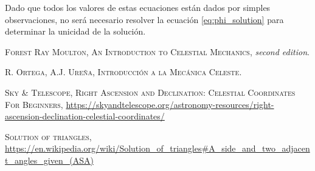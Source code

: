 \documentclass[11pt]{article}
\begin{document}
Dado que todos los valores de estas ecuaciones están dados por simples observaciones, no será necesario resolver la ecuación \eqref{eq:phi_solution} para determinar la unicidad de la solución.












\newpage

\begin{thebibliography}{99}
 \textsc{Forest Ray Moulton}, \textsc{An Introduction to Celestial Mechanics}, \textit{second edition}.

 \textsc{R. Ortega, A.J. Ureña}, \textsc{Introducción a la Mecánica Celeste}.

 \textsc{Sky \& Telescope}, \textsc{Right Ascension and Declination: Celestial Coordinates For Beginners}, \url{https://skyandtelescope.org/astronomy-resources/right-ascension-declination-celestial-coordinates/}

 \textsc{Solution of triangles}, \url{https://en.wikipedia.org/wiki/Solution_of_triangles#A_side_and_two_adjacent_angles_given_(ASA)}

\end{thebibliography}
\end{document}
